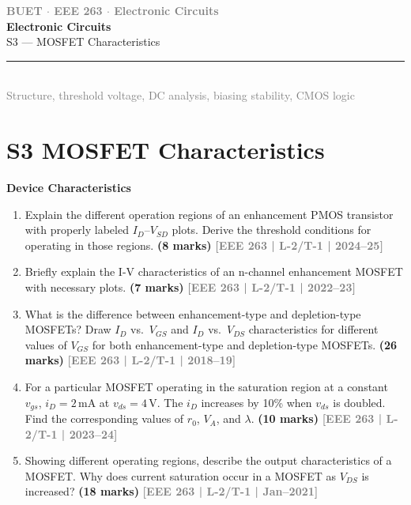 \documentclass[12pt,a4paper]{article}
\newcommand{\yr}[1]{\hfill\textcolor{gray}{\small\textbf{[#1]}}}
\newcommand{\mk}[1]{\textcolor{orange!70!black}{\small\textbf{(#1 marks)}}}
\newcommand{\subtopic}[2]{%
  \vspace{10pt}
  \noindent\begin{tcolorbox}[colback=#1!8,colframe=#1,boxrule=0.6pt,arc=4pt,
    left=6pt,right=6pt,top=4pt,bottom=4pt]
    \small\bfseries\textcolor{#1}{#2}
  \end{tcolorbox}
  \vspace{2pt}
}
\newcommand{\secdivider}[3]{%
  \newpage\thispagestyle{empty}%
  \vspace*{\fill}%
  \begin{tcolorbox}[enhanced,colback=#3!6,colframe=#3,boxrule=1.5pt,arc=8pt,
    left=20pt,right=20pt,top=22pt,bottom=22pt,
    shadow={3pt}{-3pt}{0pt}{black!15}]
    \centering
    {\large\textcolor{gray}{\textbf{BUET $\cdot$ EEE 263 $\cdot$ Electronic Circuits}}}\\[8pt]
    {\fontsize{26}{32}\selectfont\bfseries\textcolor{#3}{Electronic Circuits}}\\[6pt]
    {\fontsize{15}{19}\selectfont\textcolor{dgray}{#1}}\\[12pt]
    \textcolor{#3!60}{\rule{0.5\textwidth}{0.5pt}}\\[6pt]
    {\small\textcolor{gray}{#2}}
  \end{tcolorbox}%
  \vspace*{\fill}\newpage%
}
\begin{document}
\secdivider{S3 --- MOSFET Characteristics}{Structure, threshold voltage, DC analysis, biasing stability, CMOS logic}{cA}

\label{sec:S3}
\section*{S3 \quad MOSFET Characteristics}

\subtopic{cA}{Device Characteristics}
\label{sub:s3-devchar}

\begin{enumerate}

\item Explain the different operation regions of an enhancement PMOS transistor with properly labeled $I_D$--$V_{SD}$ plots. Derive the threshold conditions for operating in those regions.
\mk{8} \yr{EEE 263 | L-2/T-1 | 2024--25}

\item Briefly explain the I-V characteristics of an n-channel enhancement MOSFET with necessary plots.
\mk{7} \yr{EEE 263 | L-2/T-1 | 2022--23}

\item What is the difference between enhancement-type and depletion-type MOSFETs? Draw $I_D$ vs.\ $V_{GS}$ and $I_D$ vs.\ $V_{DS}$ characteristics for different values of $V_{GS}$ for both enhancement-type and depletion-type MOSFETs.
\mk{26} \yr{EEE 263 | L-2/T-1 | 2018--19}

\item For a particular MOSFET operating in the saturation region at a constant $v_{gs}$, $i_D=2\,\text{mA}$ at $v_{ds}=4\,\text{V}$. The $i_D$ increases by 10\% when $v_{ds}$ is doubled. Find the corresponding values of $r_0$, $V_A$, and $\lambda$.
\mk{10} \yr{EEE 263 | L-2/T-1 | 2023--24}

\item Showing different operating regions, describe the output characteristics of a MOSFET. Why does current saturation occur in a MOSFET as $V_{DS}$ is increased?
\mk{18} \yr{EEE 263 | L-2/T-1 | Jan--2021}

\end{enumerate}
\end{document}
